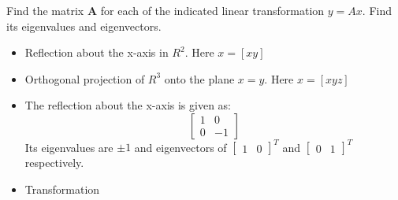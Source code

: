 Find the matrix $\boldsymbol{A}$ for each of the indicated linear transformation $y=Ax$. Find its eigenvalues and eigenvectors.
\begin{itemize}
	\item Reflection about the x-axis in $R^2$. Here $x=\left[x y \right]$
	\item Orthogonal projection of $R^3$ onto the plane $x=y$. Here $x=\left[x y z\right]$
\end{itemize}
\begin{itemize}
	\item The reflection about the x-axis is given as:
	\begin{equation*}
	\boxed{
		\begin{bmatrix}
			1&0\\0&-1
		\end{bmatrix}
		}
	\end{equation*}
	Its eigenvalues are $\pm 1$ and eigenvectors of $\begin{bmatrix}1 & 0\end{bmatrix}^T$ and $\begin{bmatrix}0 &1\end{bmatrix}^T$ respectively.

	\item Transformation 
\end{itemize}